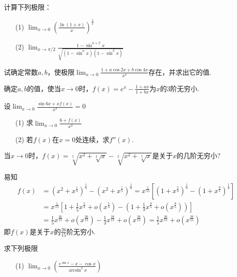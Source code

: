 \begin{xiti}
\item 计算下列极限：
\begin{enumerate}
	\item[(1)] $\lim _ { x \rightarrow 0 } \left( \frac { \ln ( 1 + x ) } { x } \right) ^ { \frac { 1 } { x } }$
	\item[(2)] $\lim _ { x \rightarrow \pi / 2 } \frac { 1 - \sin ^ { \alpha + \beta } x } { \sqrt { \left( 1 - \sin ^ { \alpha } x \right) \left( 1 - \sin ^ { \beta } x \right) } }$
\end{enumerate}
\item 试确定常数$a,b$，使极限$\lim _ { x \rightarrow 0 } \frac { 1 + a \cos 2 x + b \cos 4 x } { x ^ { 4 } }$存在，并求出它的值.
\item 确定$a,b$的值，使当$x\rightarrow0$时，$f ( x ) = e ^ { x } - \frac { 1 + a x } { 1 + b x }$为$x$的$3$阶无穷小.
\item 设$\lim _ { x \rightarrow 0 } \frac { \sin 6 x + x f ( x ) } { x ^ { 3 } } = 0$
\begin{enumerate}
	\item[(1)] 求$\lim _ { x \rightarrow 0 } \frac { 6 + f ( x ) } { x ^ { 2 } }$
	\item[(2)] 若$f(x)$在$x=0$处连续，求$f''(x)$.
\end{enumerate}
\item 当$ x \rightarrow 0$时，$f ( x ) = \sqrt [ 5 ] { x ^ { 2 } + \sqrt [ 3 ] { x } } - \sqrt [ 3 ] { x ^ { 2 } + \sqrt [ 5 ] { x } }$是关于$x$的几阶无穷小?
\begin{solution}
	易知
	\begin{align*}
	f(x)&=\left(x^{2}+x^{\frac{1}{3}}\right)^{\frac{1}{5}}-\left(x^{2}+x^{\frac{1}{5}}\right)^{\frac{1}{3}}=x^{\frac{1}{15}}\left[\left(1+x^{\frac{5}{3}}\right)^{\frac{1}{5}}-\left(1+x^{\frac{9}{5}}\right)^{\frac{1}{3}}\right]\\
	&=x^{\frac{1}{15}}\left[1+\frac{1}{5} x^{\frac{5}{3}}+o\left(x^{\frac{5}{3}}\right)-\left(1+\frac{1}{3}x^{\frac{9}{5}}+o\left(x^{\frac{9}{5}}\right)\right)\right]\\
	&=\frac{1}{5}x^{\frac{26}{15}}+o\left(x^{\frac{26}{15}}\right)-\frac{1}{3}x^{\frac{28}{15}}+o\left(x^{\frac{28}{15}}\right)=\frac{1}{5}x^{\frac{26}{15}}+o\left(x^{\frac{26}{15}}\right)
	\end{align*}
	即$f(x)$是关于$x$的$\frac{26}{15}$阶无穷小.
\end{solution}
\item 求下列极限
\begin{enumerate}
	\item[(1)] $\lim _ { x \rightarrow 0 } \left( \frac {e ^ { \sin x } - x - \cos x } { \arcsin ^ { 2 } x } \right)$

\end{enumerate}
\end{xiti}
